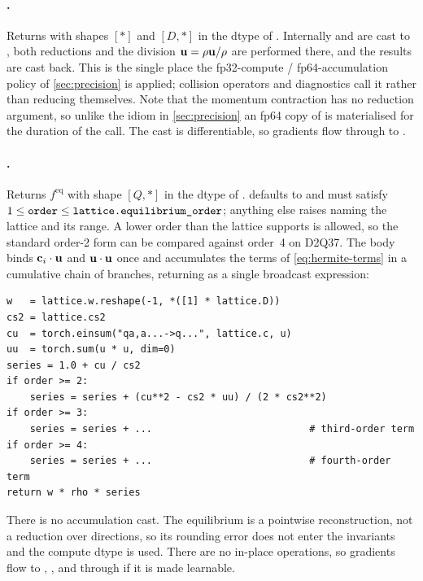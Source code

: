 \paragraph{.}
Returns  with shapes $[\ast]$ and $[D, \ast]$ in the dtype of .
Internally  and  are cast to ,
both reductions and the division $\mathbf{u} = \rho\mathbf{u}/\rho$ are performed there, and the results
are cast back. This is the single place the fp32-compute / fp64-accumulation policy of
\cref{sec:precision} is applied; collision operators and diagnostics call it rather than
reducing  themselves. Note that the momentum contraction has no reduction
 argument, so unlike the  idiom in \cref{sec:precision} an fp64 copy
of  is materialised for the duration of the call. The cast is differentiable, so
gradients flow through  to .

\paragraph{.}
Returns $f^{\mathrm{eq}}$ with shape $[Q, \ast]$ in the dtype of . 
defaults to  and must satisfy
$1 \le \texttt{order} \le \texttt{lattice.equilibrium\_order}$; anything else raises
 naming the lattice and its range. A lower order than the lattice supports
is allowed, so the standard order-2 form can be compared against order~4 on D2Q37. The body
binds $\mathbf{c}_i\cdot\mathbf{u}$ and $\mathbf{u}\cdot\mathbf{u}$ once and accumulates the terms of
\cref{eq:hermite-terms} in a cumulative chain of  branches, returning
 as a single broadcast expression:
\begin{lstlisting}[style=py]
w   = lattice.w.reshape(-1, *([1] * lattice.D))
cs2 = lattice.cs2
cu  = torch.einsum("qa,a...->q...", lattice.c, u)
uu  = torch.sum(u * u, dim=0)
series = 1.0 + cu / cs2
if order >= 2:
    series = series + (cu**2 - cs2 * uu) / (2 * cs2**2)
if order >= 3:
    series = series + ...                           # third-order term
if order >= 4:
    series = series + ...                           # fourth-order term
return w * rho * series
\end{lstlisting}
There is no accumulation cast. The equilibrium is a pointwise reconstruction, not a
reduction over directions, so its rounding error does not enter the invariants and the
compute dtype is used. There are no in-place operations, so gradients flow to ,
, and through  if it is made learnable.


